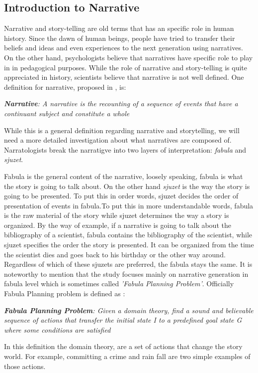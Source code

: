 \documentclass[english]{tktltiki}
\begin{document}
\subsection{Introduction to Narrative}
Narrative and story-telling are old terms that has an specific role in human history. Since the dawn of human beings, people have tried to transfer their beliefs and ideas and even experiences to the next generation using narratives. On the other hand, psychologists believe that narratives have specific role to play in in pedagogical purposes. While the role of narrative and story-telling is quite appreciated in history, scientists believe that narrative is not well defined. One definition for narrative, proposed in \cite{planning:2010:NPB:1946417.1946422}, is:
\begin{flushleft}
\textit{\textbf{Narrative}: A narrative is the recounting of a sequence of events that have a continuant subject and constitute a whole } 
\end{flushleft}

While this is a general definition regarding narrative and storytelling, we will need a more detailed investigation about what narratives are composed of. Narratologists break the narratigve into two layers of interpretation: \textit{fabula} and \textit{sjuzet}. 

Fabula is the general content of the narrative, loosely speaking, fabula is what the story is going to talk about. On the other hand \textit{sjuzet} is the way the story is going to be presented. To put this in order words, sjuzet decides the order of presentation of events in fabula.To put this in more understandable words, fabula is the raw material of the story while sjuzet determines the way a story is organized. By the way of example, if a narrative is going to talk about the bibliography of a scientist, fabula contains the bibliography of the scientist, while sjuzet specifies the order the story is presented. It can be organized from the time the scientist dies and goes back to his birthday or the other way around. Regardless of which of these sjuzets are preferred, the fabula stays the same. \newline
It is noteworthy to mention that the study focuses mainly on narrative generation in fabula level which is sometimes called \textit{'Fabula Planning Problem'}. Officially Fabula Planning problem is defined as \cite{planning:2010:NPB:1946417.1946422}: 
\begin{flushleft}
\textit{\textbf{Fabula Planning Problem}: Given a domain theory, find a sound and believable sequence of actions that transfer the initial state \textit{I} to a predefined goal state \textit{G} where some conditions are satisfied }
\end{flushleft}
In this definition the domain theory, are a set of actions that change the story world. For example, committing a crime and rain fall are two simple examples of those actions. 
\end{document}
